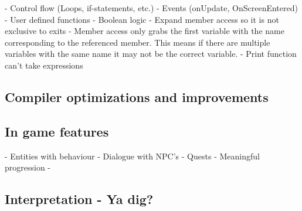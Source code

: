- Control flow (Loops, if-statements, etc.)
- Events (onUpdate, OnScreenEntered)
- User defined functions
- Boolean logic
- Expand member access so it is not exclusive to exits
    - Member access only grabs the first variable with the name corresponding to the referenced member. This means if there are multiple variables with the same name it may    not be the correct variable.
- Print function can't take expressions


\subsection*{Compiler optimizations and improvements}

\subsection*{In game features}
- Entities with behaviour
- Dialogue with NPC's
- Quests
- Meaningful progression
- 

\subsection*{Interpretation - Ya dig?}